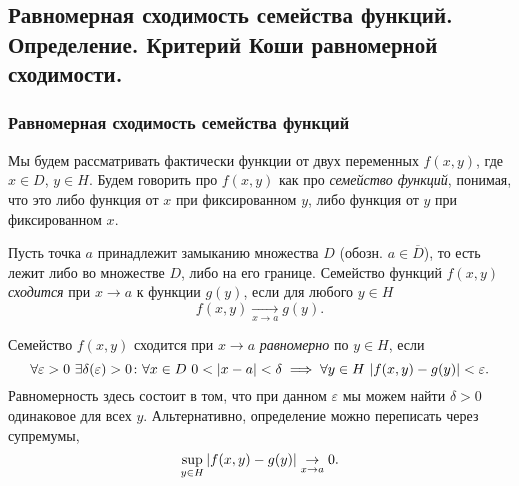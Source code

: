 \subsection{Равномерная сходимость семейства функций. Определение. Критерий Коши равномерной сходимости.}

\subsubsection{Равномерная сходимость семейства функций}

Мы будем рассматривать фактически функции от двух переменных $f(x, y)$, где $x \in D$, $y \in H$.
Будем говорить про $f(x, y)$ как про {\it семейство функций}, понимая, что это либо функция от $x$ при фиксированном $y$, либо функция от $y$ при фиксированном $x$.

\begin{definition}
    Пусть точка $a$ принадлежит замыканию множества $D$ (обозн. $a \in \overline{D}$), то есть лежит либо во множестве $D$, либо на его границе.
    Семейство функций $f(x, y)$ {\it сходится} при $x \to a$ к функции $g(y)$, если для любого $y \in H$
    \[
        f(x, y) \underset{x \to a}{\to} g(y).
    \]
\end{definition}

\begin{definition}
    Семейство $f(x, y)$ сходится при $x \to a$ {\it равномерно} по $y \in H$, если
    \[
         \forall \varepsilon > 0~ \exists \delta(\varepsilon) > 0 \colon \forall x \in D ~ 0 < \abs{x - a} < \delta \implies \forall y \in H ~ \abs{f(x, y) - g(y)} < \varepsilon.
    \]
    Равномерность здесь состоит в том, что при данном $\varepsilon$ мы можем найти $\delta > 0$ одинаковое для всех $y$.
    Альтернативно, определение можно переписать через супремумы,
    \[
        \sup\limits_{y \in H} \abs{f(x, y) - g(y)} \underset{x \to a}{\to} 0.
    \]
\end{definition}

